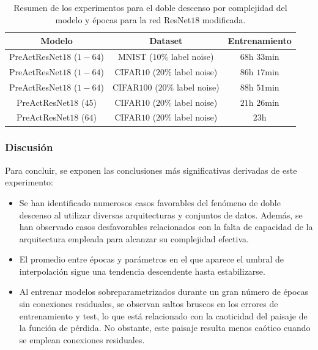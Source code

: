 \begin{table}[h!]
    \centering
    \begin{tabular}{|c|c|c|}
    \hline
    \textbf{Modelo}       & \textbf{Dataset} & \textbf{Entrenamiento} \\ 
    \hline
    PreActResNet$18$ ($1-64$) & MNIST ($10$\% label noise)        & $68$h $33$min \\ 
    PreActResNet$18$ ($1-64$) & CIFAR$10$  ($20$\% label noise)   & $86$h $17$min \\
    PreActResNet$18$ ($1-64$) & CIFAR$100$  ($20$\% label noise)   & $88$h $51$min \\
    PreActResNet$18$ ($45$) & CIFAR$10$  ($20$\% label noise)   & $21$h $26$min \\
    PreActResNet$18$ ($64$) & CIFAR$10$  ($20$\% label noise)   & $23$h \\
    \hline
    \end{tabular}
    \caption[Resumen de los experimentos para el doble descenso por complejidad del modelo y épocas para la red ResNet$18$ modificada.]{Resumen de los experimentos para el doble descenso por complejidad del modelo y épocas para la red ResNet$18$ modificada.}\label{tab:preactresnet_model-epochwise}
\end{table}

\subsubsection{Discusión}\label{subsubsec:discusion-model-epoch}

Para concluir, se exponen las conclusiones más significativas derivadas de este experimento:

\begin{itemize}
    \item Se han identificado numerosos casos favorables del fenómeno de doble descenso al utilizar diversas arquitecturas y conjuntos de datos. Además, se han observado casos desfavorables relacionados con la falta de capacidad de la arquitectura empleada para alcanzar su complejidad efectiva.
    \item El promedio entre épocas y parámetros en el que aparece el umbral de interpolación sigue una tendencia descendente hasta estabilizarse.
    \item Al entrenar modelos sobreparametrizados durante un gran número de épocas sin conexiones residuales, se observan saltos bruscos en los errores de entrenamiento y test, lo que está relacionado con la caoticidad del paisaje de la función de pérdida. No obstante, este paisaje resulta menos caótico cuando se emplean conexiones residuales.
\end{itemize}

